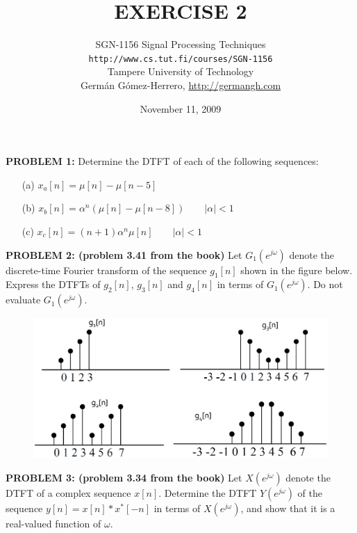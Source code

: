 \documentclass[a4paper,11pt,oneside]{article}
\title{\large{\textbf{EXERCISE 2}}}
\author{SGN-1156 Signal Processing Techniques\\
\texttt{http://www.cs.tut.fi/courses/SGN-1156}\\
Tampere University of Technology\\
Germ\'an G\'omez-Herrero, \url{http://germangh.com}}
\date{November 11, 2009}
\begin{document}
\maketitle



\textbf{PROBLEM 1:} Determine the DTFT of each of the following sequences:

\begin{itemize}
\item[(a)] $x_a[n] = \mu[n]-\mu[n-5]$
\item[(b)] $x_b[n] = \alpha^n\left(\mu[n]-\mu[n-8]\right) \qquad |\alpha|< 1$
\item[(c)] $x_c[n] = (n+1)\alpha^n\mu[n] \qquad |\alpha|<1$
\end{itemize}  



\vspace{1cm}




\textbf{PROBLEM 2: (problem 3.41 from the book)} Let $G_1(e^{j\omega})$ denote the discrete-time Fourier transform of the sequence $g_1[n]$ shown in the figure below. Express the DTFTs of $g_2[n]$, $g_3[n]$ and $g_4[n]$ in terms of $G_1(e^{j\omega})$. Do not evaluate $G_1(e^{j\omega})$.


\begin{figure}[ht!]
\centering
\includegraphics[width=.8\textwidth]{fig4.eps}
\end{figure}


\vspace{1cm}



\textbf{PROBLEM 3: (problem 3.34 from the book)} Let $X(e^{j\omega})$ denote the DTFT of a complex sequence $x[n]$. Determine the DTFT $Y(e^{j\omega})$ of the sequence $y[n]=x[n]\ast x^*[-n]$ in terms of $X(e^{j\omega})$, and show that it is a real-valued function of $\omega$.
\end{document}
